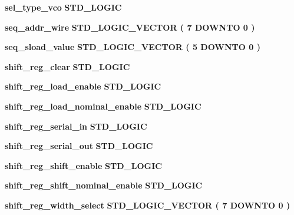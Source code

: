 \begin{DoxyCompactItemize}
\item 
{\bf sel\+\_\+type\+\_\+vco} {\bfseries \textcolor{comment}{S\+T\+D\+\_\+\+L\+O\+G\+IC}\textcolor{vhdlchar}{ }} 
\item 
{\bf seq\+\_\+addr\+\_\+wire} {\bfseries \textcolor{comment}{S\+T\+D\+\_\+\+L\+O\+G\+I\+C\+\_\+\+V\+E\+C\+T\+OR}\textcolor{vhdlchar}{ }\textcolor{vhdlchar}{(}\textcolor{vhdlchar}{ }\textcolor{vhdlchar}{ } \textcolor{vhdldigit}{7} \textcolor{vhdlchar}{ }\textcolor{keywordflow}{D\+O\+W\+N\+TO}\textcolor{vhdlchar}{ }\textcolor{vhdlchar}{ } \textcolor{vhdldigit}{0} \textcolor{vhdlchar}{ }\textcolor{vhdlchar}{)}\textcolor{vhdlchar}{ }} 
\item 
{\bf seq\+\_\+sload\+\_\+value} {\bfseries \textcolor{comment}{S\+T\+D\+\_\+\+L\+O\+G\+I\+C\+\_\+\+V\+E\+C\+T\+OR}\textcolor{vhdlchar}{ }\textcolor{vhdlchar}{(}\textcolor{vhdlchar}{ }\textcolor{vhdlchar}{ } \textcolor{vhdldigit}{5} \textcolor{vhdlchar}{ }\textcolor{keywordflow}{D\+O\+W\+N\+TO}\textcolor{vhdlchar}{ }\textcolor{vhdlchar}{ } \textcolor{vhdldigit}{0} \textcolor{vhdlchar}{ }\textcolor{vhdlchar}{)}\textcolor{vhdlchar}{ }} 
\item 
{\bf shift\+\_\+reg\+\_\+clear} {\bfseries \textcolor{comment}{S\+T\+D\+\_\+\+L\+O\+G\+IC}\textcolor{vhdlchar}{ }} 
\item 
{\bf shift\+\_\+reg\+\_\+load\+\_\+enable} {\bfseries \textcolor{comment}{S\+T\+D\+\_\+\+L\+O\+G\+IC}\textcolor{vhdlchar}{ }} 
\item 
{\bf shift\+\_\+reg\+\_\+load\+\_\+nominal\+\_\+enable} {\bfseries \textcolor{comment}{S\+T\+D\+\_\+\+L\+O\+G\+IC}\textcolor{vhdlchar}{ }} 
\item 
{\bf shift\+\_\+reg\+\_\+serial\+\_\+in} {\bfseries \textcolor{comment}{S\+T\+D\+\_\+\+L\+O\+G\+IC}\textcolor{vhdlchar}{ }} 
\item 
{\bf shift\+\_\+reg\+\_\+serial\+\_\+out} {\bfseries \textcolor{comment}{S\+T\+D\+\_\+\+L\+O\+G\+IC}\textcolor{vhdlchar}{ }} 
\item 
{\bf shift\+\_\+reg\+\_\+shift\+\_\+enable} {\bfseries \textcolor{comment}{S\+T\+D\+\_\+\+L\+O\+G\+IC}\textcolor{vhdlchar}{ }} 
\item 
{\bf shift\+\_\+reg\+\_\+shift\+\_\+nominal\+\_\+enable} {\bfseries \textcolor{comment}{S\+T\+D\+\_\+\+L\+O\+G\+IC}\textcolor{vhdlchar}{ }} 
\item 
{\bf shift\+\_\+reg\+\_\+width\+\_\+select} {\bfseries \textcolor{comment}{S\+T\+D\+\_\+\+L\+O\+G\+I\+C\+\_\+\+V\+E\+C\+T\+OR}\textcolor{vhdlchar}{ }\textcolor{vhdlchar}{(}\textcolor{vhdlchar}{ }\textcolor{vhdlchar}{ } \textcolor{vhdldigit}{7} \textcolor{vhdlchar}{ }\textcolor{keywordflow}{D\+O\+W\+N\+TO}\textcolor{vhdlchar}{ }\textcolor{vhdlchar}{ } \textcolor{vhdldigit}{0} \textcolor{vhdlchar}{ }\textcolor{vhdlchar}{)}\textcolor{vhdlchar}{ }} 

\end{DoxyCompactItemize}
